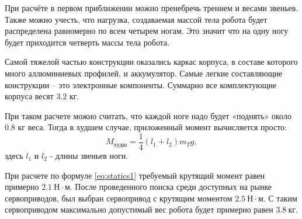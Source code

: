 При расчёте в первом приближении можно пренебречь трением и весами звеньев. Также можно учесть, что нагрузка, создаваемая массой тела робота будет распределена равномерно по всем четырем ногам. Это значит что на одну ногу будет приходится четверть массы тела робота.

Самой тяжелой частью конструкции оказались каркас корпуса, в составе которого много аллюминиевых профилей, и аккумулятор. Самые легкие составляющие конструкции -- это электронные компоненты. Суммарно все комплектующие корпуса весят $3.2$ кг. 

При таком расчете можно считать, что каждой ноге надо будет «поднять» около $ 0.8 $ кг веса. Тогда в худшем случае, приложенный момент вычисляется просто:
\begin{equation} \label{eq:statics1}
    M_{худш}= \frac 1 4 (l_{1}+l_{2}) m_T g, 
\end{equation}
\noindent здесь $l_1$ и $l_2$ - длины звеньев ноги.

При расчете по формуле \ref{eq:statics1} требуемый крутящий момент равен примерно $ 2.1  \: Н \cdot м$. После проведенного поиска среди доступных на рынке сервоприводов, был выбран сервопривод с крутящим моментом $ 2.5 \: Н \cdot м $. С таким сервоприводом максимально допустимый вес робота будет примерно равен $ 3.8 \: кг $.
